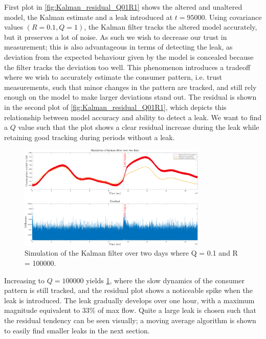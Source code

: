 First plot in \cref{fig:Kalman_residual_Q01R1} shows the altered and unaltered model, the Kalman estimate and a leak introduced at $t = 95000$. Using covariance values $(R = 0.1, Q = 1)$, the Kalman filter tracks the altered model accurately, but it preserves a lot of noise. As such we wish to decrease our trust in measurement; this is also advantageous in terms of detecting the leak, as deviation from the expected behaviour given by the model is concealed because the filter tracks the deviation too well. This phenomenon introduces a tradeoff where we wish to accurately estimate the consumer pattern, i.e. trust measurements, such that minor changes in the pattern are tracked, and still rely enough on the model to make larger deviations stand out. The residual is shown in the second plot of \cref{fig:Kalman_residual_Q01R1}, which depicts this relationship between model accuracy and ability to detect a leak. We want to find a $Q$ value such that the plot shows a clear residual increase during the leak while retaining good tracking during periods without a leak. 

\begin{figure}[h!]
	\centering
	\includegraphics[width=0.8\textwidth]{Pictures/Kalman_and_Residual_Q01_R100000.pdf}
	
	\caption{Simulation of the Kalman filter over two days where Q = 0.1 and R = 100000.}
	\label{fig:Kalman_residual_Q01R100000}
\end{figure}

Increasing to $Q = 100000$ yields \cref{fig:Kalman_residual_Q01R100000}, where the slow dynamics of the consumer pattern is still tracked, and the residual plot shows a noticeable spike when the leak is introduced. The leak gradually develops over one hour, with a maximum magnitude equivalent to $33\%$ of max flow. Quite a large leak is chosen such that the residual tendency can be seen visually; a moving average algorithm is shown to easily find smaller leaks in the next section. 

